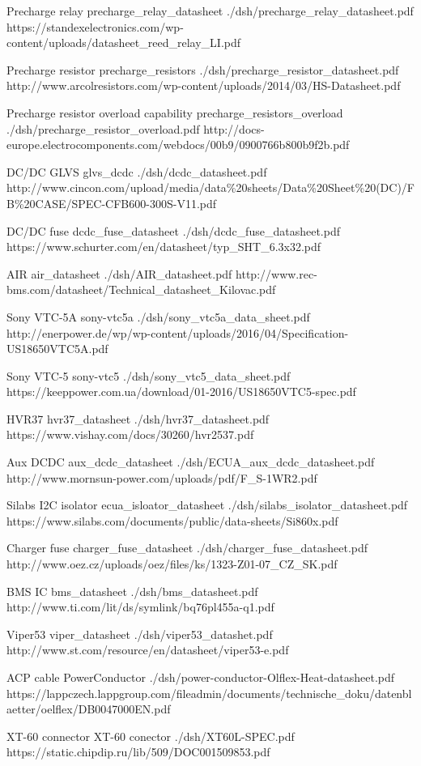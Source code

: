 	{Precharge relay}
	{precharge_relay_datasheet}
	{./dsh/precharge_relay_datasheet.pdf}
	{https://standexelectronics.com/wp-content/uploads/datasheet_reed_relay_LI.pdf}

	{Precharge resistor}
	{precharge_resistors}
	{./dsh/precharge_resistor_datasheet.pdf}
	{http://www.arcolresistors.com/wp-content/uploads/2014/03/HS-Datasheet.pdf}

	{Precharge resistor overload capability}
	{precharge_resistors_overload}
	{./dsh/precharge_resistor_overload.pdf}
	{http://docs-europe.electrocomponents.com/webdocs/00b9/0900766b800b9f2b.pdf}

	{DC/DC GLVS}
	{glvs_dcdc}
	{./dsh/dcdc_datasheet.pdf}
	{http://www.cincon.com/upload/media/data\%20sheets/Data\%20Sheet\%20(DC)/FB\%20CASE/SPEC-CFB600-300S-V11.pdf}

	{DC/DC fuse}
	{dcdc_fuse_datasheet}
	{./dsh/dcdc_fuse_datasheet.pdf}
	{https://www.schurter.com/en/datasheet/typ_SHT_6.3x32.pdf}

	{AIR}
	{air_datasheet}
	{./dsh/AIR_datasheet.pdf}
	{http://www.rec-bms.com/datasheet/Technical_datasheet_Kilovac.pdf}

	{Sony VTC-5A}
	{sony-vtc5a}
	{./dsh/sony_vtc5a_data_sheet.pdf}
	{http://enerpower.de/wp/wp-content/uploads/2016/04/Specification-US18650VTC5A.pdf}

	{Sony VTC-5}
	{sony-vtc5}
	{./dsh/sony_vtc5_data_sheet.pdf}
	{https://keeppower.com.ua/download/01-2016/US18650VTC5-spec.pdf}

	{HVR37}
	{hvr37_datasheet}
	{./dsh/hvr37_datasheet.pdf}
	{https://www.vishay.com/docs/30260/hvr2537.pdf}

	{Aux DCDC}
	{aux_dcdc_datasheet}
	{./dsh/ECUA_aux_dcdc_datasheet.pdf}
	{http://www.mornsun-power.com/uploads/pdf/F_S-1WR2.pdf}

	{Silabs I2C isolator}
	{ecua_isloator_datasheet}
	{./dsh/silabs_isolator_datasheet.pdf}
	{https://www.silabs.com/documents/public/data-sheets/Si860x.pdf}

	{Charger fuse}
	{charger_fuse_datasheet}
	{./dsh/charger_fuse_datasheet.pdf}
	{http://www.oez.cz/uploads/oez/files/ks/1323-Z01-07_CZ_SK.pdf}

	{BMS IC}
	{bms_datasheet}
	{./dsh/bms_datasheet.pdf}
	{http://www.ti.com/lit/ds/symlink/bq76pl455a-q1.pdf}

	{Viper53}
	{viper_datasheet}
	{./dsh/viper53_datashet.pdf}
	{http://www.st.com/resource/en/datasheet/viper53-e.pdf}

	{ACP cable}
	{PowerConductor}
	{./dsh/power-conductor-Olflex-Heat-datasheet.pdf}
	{https://lappczech.lappgroup.com/fileadmin/documents/technische_doku/datenblaetter/oelflex/DB0047000EN.pdf}

	{XT-60 connector}
	{XT-60 conector}
	{./dsh/XT60L-SPEC.pdf}
	{https://static.chipdip.ru/lib/509/DOC001509853.pdf}
